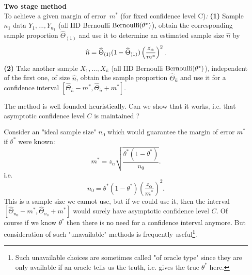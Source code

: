 \begin{algorithm}[htbp]
\label{algo-2-stage}\textbf{Two stage method }\\To achieve a given margin
of error\textit{\ }$m^{\ast }$ (for fixed confidence level C)\textit{: }%
\bigskip \newline
\textbf{(1)} Sample $n_{1}$ data $Y_{1},\ldots ,Y_{n_{1}}$ (all IID
Bernoulli $\mbox{{\rm Bernoulli}}(\theta^*)$), obtain the corresponding sample proportion $%
\widehat{\Theta}_{(1)}$ and use it to determine an estimated sample size $\widehat{n}$ by 
\begin{equation*}
\widehat{n}=\widehat{\Theta}_{(1)}(1-\widehat{\Theta}_{(1)})\left( \frac{z_{\alpha}}{%
m^{\ast }}\right) ^{2}.
\end{equation*}%
\bigskip \textbf{(2) }Take another sample $X_{1},\ldots ,X_{\widehat{n}}$ (all
IID Bernoulli $\mbox{{\rm Bernoulli}}(\theta^*)$), independent of the first one, of size $%
\widehat{n}$, obtain the sample proportion $\widehat{\Theta}_{\widehat{n}}$ and use it for a
confidence interval $\left[ \widehat{\Theta}_{\widehat{n}}-m^{\ast },\widehat{\Theta}_{\widehat{n}%
}+m^{\ast }\right] .$ \bigskip
\end{algorithm}

The method is well founded heuristically. Can we show that it works, i.e.
that asymptotic confidence level $C$ is maintained ?

Consider an "ideal sample size" $n_{0}$ which would guarantee the margin of
error $m^{\ast }$ if $\theta^*$ were known: 
\begin{equation}
m^{\ast }=z_{\alpha}\sqrt{\frac{\theta^*(1-\theta^*)}{n_{0}}}.
\label{m-star-equal}
\end{equation}%
i.e. 
\begin{equation}
n_{0}=\theta^*(1-\theta^*)\left( \frac{z_{\alpha}}{m^{\ast }}\right) ^{2}.
\label{n-null-determined}
\end{equation}%
This is a sample size we cannot use, but if we could use it, then the
interval $\left[ \widehat{\Theta}_{n_{0}}-m^{\ast },\widehat{\Theta}_{n_{0}}+m^{\ast }\right] $
would surely have asymptotic confidence level $C$. Of course if we know $\theta^*$
then there is no need for a confidence interval anymore. But consideration
of such "unavailable" methods is frequently useful\footnote{%
Such unavailable choices are sometimes called "of oracle type" since they
are only available if an oracle tells us the truth, i.e. gives the true $\theta^*$
here.}.

